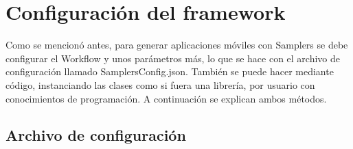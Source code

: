 \section{Configuración del framework}

Como se mencionó antes, para generar aplicaciones móviles con Samplers se debe configurar el Workflow y unos parámetros más, lo que se hace con el archivo de configuración llamado SamplersConfig.json. También se puede hacer mediante código, instanciando las clases como si fuera una librería, por usuario con conocimientos de programación. A continuación se explican ambos métodos.


\subsection{Archivo de configuración}\label{sec:archivo_configuracion}

